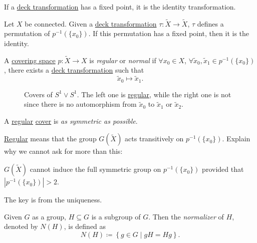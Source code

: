 \begin{corollary}
	If a \hyperref[def:deck-transformation]{deck transformation} has a fixed point, it is the identity transformation.
\end{corollary}

\begin{exercise}
	Let \(X\) be connected. Given a \hyperref[def:deck-transformation]{deck transformation} \(\tau \colon \widetilde{X} \to \widetilde{X} \), \(\tau \)
	defines a permutation of \(p^{-1} (\{x_0\})\). If this permutation has a fixed point, then it is the identity.
\end{exercise}

\begin{definition}\label{def:regular}\label{def:normal}
	A \hyperref[def:covering-space]{covering space} \(p\colon \widetilde{X} \to X\) is \emph{regular} or \emph{normal}
	if \(\forall x_0\in X\), \(\forall \widetilde{x}_0, \widetilde{x} _1 \in p^{-1} (\{x_0\})\), there exists
	a \hyperref[def:deck-transformation]{deck transformation} such that
	\[
		\widetilde{x} _0 \mapsto \widetilde{x} _1.
	\]
\end{definition}
\begin{figure}[H]
	\centering
	\caption{Covers of \(S^1\vee S^1\). The left one is \hyperref[def:regular]{regular}, while the right one is not since there is no
		automorphism from \(\widetilde{x} _0\) to \(\widetilde{x} _1\) or \(\widetilde{x} _2\).}
	\label{fig:eg:lec17:regular}
\end{figure}
\begin{remark}
	A \hyperref[def:regular]{regular} \hyperref[def:covering-map]{cover} is \emph{as symmetric as possible}.
\end{remark}

\begin{exercise}
	\hyperref[def:regular]{Regular} means that the group \(G(\widetilde{X} )\) acts transitively on \(p^{-1} (\{x_0\})\). Explain why we cannot ask for
	more than this:
	\begin{center}
		\(G(\widetilde{X})\) cannot induce the full symmetric group on \(p^{-1} (\{x_0\})\) provided that \(\left\vert p^{-1} (\{x_0\}) \right\vert > 2\).
	\end{center}
\end{exercise}
\begin{answer}
	The key is from the uniqueness.
\end{answer}

\begin{definition}[Normalizer]\label{def:normalizer}
	Given \(G\) as a group, \(H\subseteq G\) is a subgroup of \(G\). Then the \emph{normalizer} of \(H\), denoted by \(N(H)\), is defined as
	\[
		N(H) \coloneqq \left\{g\in G \mid gH = H g\right\}.
	\]
\end{definition}

